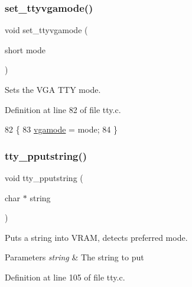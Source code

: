 \subsubsection{\texorpdfstring{set\+\_\+ttyvgamode()}{set\_ttyvgamode()}}
{\footnotesize\ttfamily void set\+\_\+ttyvgamode (\begin{DoxyParamCaption}\item[{short}]{mode }\end{DoxyParamCaption})}



Sets the V\+GA T\+TY mode. 



Definition at line 82 of file tty.\+c.


\begin{DoxyCode}
82                                 \{
83     \hyperlink{a00173_af93b0649fdd1bea5b6d29ed37205aa2c_af93b0649fdd1bea5b6d29ed37205aa2c}{vgamode} = mode;
84 \}
\end{DoxyCode}
\mbox{\label{a00176_ade960b1320324706aac6c00cc6b1b2fe_ade960b1320324706aac6c00cc6b1b2fe}} 
\subsubsection{\texorpdfstring{tty\+\_\+pputstring()}{tty\_pputstring()}}
{\footnotesize\ttfamily void tty\+\_\+pputstring (\begin{DoxyParamCaption}\item[{char $\ast$}]{string }\end{DoxyParamCaption})}



Puts a string into V\+R\+AM, detects preferred mode. 


\begin{DoxyParams}{Parameters}
{\em string} & The string to put \\
\hline
\end{DoxyParams}


Definition at line 105 of file tty.\+c.


